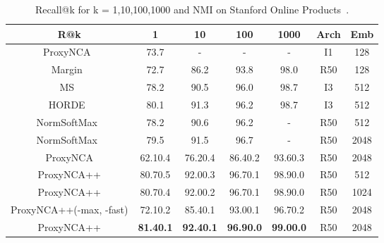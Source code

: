 \documentclass[runningheads]{llncs}
\begin{document}
\begin{table}[htb]
\centering
\caption{Recall@k for k = 1,10,100,1000 and NMI on Stanford Online Products~\cite{song2016deep}.}
\setlength{\tabcolsep}{2pt}
\begin{tabular}{|*7c|}
\hline
R@k & 1 & 10 & 100 & 1000 & Arch & Emb \\ \hline
\small{ProxyNCA~\cite{movshovitz2017no}} & 73.7 & - & - & - & \small{I1}& \small{128}\\
\small{Margin~\cite{wu2017sampling}} & 72.7 & 86.2 & 93.8 & 98.0 &\small{R50}& \small{128}\\
\small{MS~\cite{wang2019multi}}& 78.2 & 90.5 & 96.0 & 98.7 & \small{I3}& \small{512}\\
\small{HORDE~\cite{jacob2019metric}}& 80.1 & 91.3 & 96.2 & 98.7 & \small{I3}& \small{512}\\
\small{NormSoftMax~\cite{zhai2019}}& 78.2 & 90.6 & 96.2 & - &  \small{R50}& \small{512}\\
\small{NormSoftMax~\cite{zhai2019}}& 79.5 & 91.5 & 96.7 & - &  \small{R50}& \small{2048}\\
\hline
\small{ProxyNCA}& 62.10.4 & 76.20.4 & 86.40.2 & 93.60.3 &  \small{R50}& \small{2048}\\
\small{ProxyNCA++}& 80.70.5 & 92.00.3 & 96.70.1 & 98.90.0 &  \small{R50}& \small{512}\\
\small{ProxyNCA++}& 80.70.4 & 92.00.2 & 96.70.1 & 98.90.0 &  \small{R50}& \small{1024}\\
\small{ProxyNCA++(-max, -fast)}& 72.10.2 & 85.40.1 & 93.00.1 & 96.70.2 &  \small{R50}& \small{2048}\\
\small{ProxyNCA++}& \textbf{81.40.1} & \textbf{92.40.1} & \textbf{96.90.0} & \textbf{99.00.0} &  \small{R50}& \small{2048}\\
\hline
\end{tabular}
\label{table:sop}
\end{table}
\end{document}
